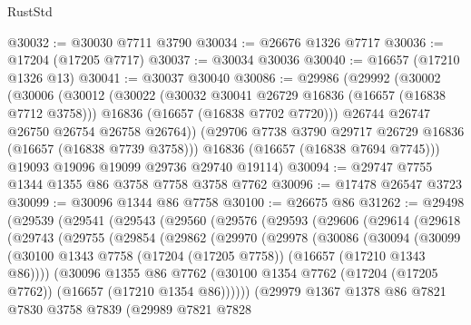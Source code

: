\begin{lexlean}{RustStd}
\begin{coremodule}
@30032 := @30030 @7711 @3790
@30034 := @26676 @1326 @7717
@30036 := @17204 (@17205 @7717)
@30037 := @30034 @30036
@30040 := @16657 (@17210 @1326 @13)
@30041 := @30037 @30040
@30086 := @29986
    (@29992
      (@30002
        (@30006
          (@30012
            (@30022
              (@30032 @30041 @26729 @16836 (@16657 (@16838 @7712 @3758)))
              @16836
              (@16657 (@16838 @7702 @7720)))
            @26744
            @26747
            @26750
            @26754
            @26758
            @26764))
        (@29706 @7738 @3790 @29717 @26729 @16836 (@16657 (@16838 @7739 @3758)))
        @16836
        (@16657 (@16838 @7694 @7745)))
      @19093
      @19096
      @19099
      @29736
      @29740
      @19114)
@30094 := @29747 @7755 @1344 @1355 @86 @3758 @7758 @3758 @7762
@30096 := @17478 @26547 @3723
@30099 := @30096 @1344 @86 @7758
@30100 := @26675 @86
@31262 := @29498
    (@29539
      (@29541
        (@29543
          (@29560
            (@29576
              (@29593
                (@29606
                  (@29614
                    (@29618
                      (@29743
                        (@29755
                          (@29854
                            (@29862
                              (@29970
                                (@29978
                                  (@30086
                                    (@30094
                                      (@30099
                                        (@30100
                                          @1343
                                          @7758
                                          (@17204 (@17205 @7758))
                                          (@16657 (@17210 @1343 @86))))
                                      (@30096
                                        @1355
                                        @86
                                        @7762
                                        (@30100
                                          @1354
                                          @7762
                                          (@17204 (@17205 @7762))
                                          (@16657 (@17210 @1354 @86))))))
                                  (@29979
                                    @1367
                                    @1378
                                    @86
                                    @7821
                                    @7830
                                    @3758
                                    @7839
                                    (@29989
                                      @7821
                                      @7828

\end{coremodule}
\end{lexlean}
